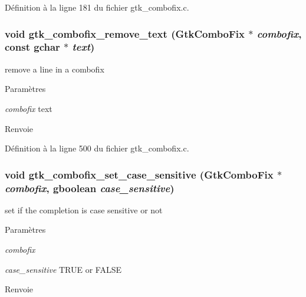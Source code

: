Définition à la ligne 181 du fichier gtk\_\-combofix.c.

\subsubsection[{gtk\_\-combofix\_\-remove\_\-text}]{\setlength{\rightskip}{0pt plus 5cm}void gtk\_\-combofix\_\-remove\_\-text ({\bf GtkComboFix} $\ast$ {\em combofix}, \/  const gchar $\ast$ {\em text})}\label{gtk__combofix_8c_a0b47a7c0d8c8cc2772313880d2f2b0e1}
remove a line in a combofix


\begin{DoxyParams}{Paramètres}
\item[{\em combofix}]text\end{DoxyParams}
\begin{DoxyReturn}{Renvoie}

\end{DoxyReturn}


Définition à la ligne 500 du fichier gtk\_\-combofix.c.

\subsubsection[{gtk\_\-combofix\_\-set\_\-case\_\-sensitive}]{\setlength{\rightskip}{0pt plus 5cm}void gtk\_\-combofix\_\-set\_\-case\_\-sensitive ({\bf GtkComboFix} $\ast$ {\em combofix}, \/  gboolean {\em case\_\-sensitive})}\label{gtk__combofix_8c_ac7743a3ebf76e8dc9203d696dbc02cae}
set if the completion is case sensitive or not


\begin{DoxyParams}{Paramètres}
\item[{\em combofix}]\item[{\em case\_\-sensitive}]TRUE or FALSE\end{DoxyParams}
\begin{DoxyReturn}{Renvoie}

\end{DoxyReturn}


